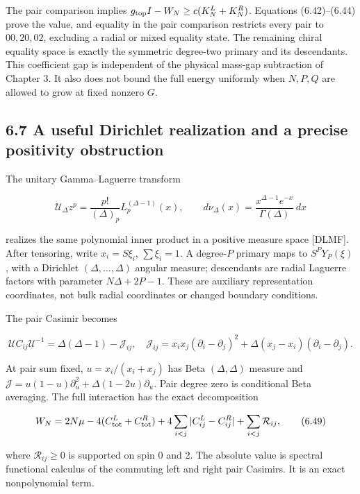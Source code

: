 \documentclass[a4paper,11pt]{article}
\numberwithin{equation}{section}
\begin{document}
The pair comparison implies \(g_{\rm top}I-W_N\ge c(K_N^L+K_N^R)\). Equations (6.42)--(6.44) prove the value, and equality in the pair comparison restricts every pair to \(00,20,02\), excluding a radial or mixed equality state. The remaining chiral equality space is exactly the symmetric degree-two primary and its descendants. This coefficient gap is independent of the physical mass-gap subtraction of Chapter 3. It also does not bound the full energy uniformly when \(N,P,Q\) are allowed to grow at fixed nonzero \(G\).

\hypertarget{a-useful-dirichlet-realization-and-a-precise-positivity-obstruction}{%
\subsection{6.7 A useful Dirichlet realization and a precise positivity obstruction}\label{a-useful-dirichlet-realization-and-a-precise-positivity-obstruction}}

The unitary Gamma--Laguerre transform

\[
\mathcal U_\Delta z^p=\frac{p!}{(\Delta)_p}L_p^{(\Delta-1)}(x),
\qquad d\nu_\Delta(x)=\frac{x^{\Delta-1}e^{-x}}{\Gamma(\Delta)}\,dx
\tag{6.47}
\]

realizes the same polynomial inner product in a positive measure space {[}DLMF{]}. After tensoring, write \(x_i=S\xi_i\), \(\sum\xi_i=1\). A degree-\(P\) primary maps to \(S^PY_P(\xi)\), with a Dirichlet \((\Delta,\ldots,\Delta)\) angular measure; descendants are radial Laguerre factors with parameter \(N\Delta+2P-1\). These are auxiliary representation coordinates, not bulk radial coordinates or changed boundary conditions.

The pair Casimir becomes

\[
\mathcal U C_{ij}\mathcal U^{-1}=\Delta(\Delta-1)-\mathcal J_{ij},
\quad
\mathcal J_{ij}=x_ix_j(\partial_i-\partial_j)^2
+\Delta(x_j-x_i)(\partial_i-\partial_j).
\tag{6.48}
\]

At pair sum fixed, \(u=x_i/(x_i+x_j)\) has Beta \((\Delta,\Delta)\) measure and \(\mathcal J=u(1-u)\partial_u^2+\Delta(1-2u)\partial_u\). Pair degree zero is conditional Beta averaging. The full interaction has the exact decomposition

\[
W_N=2N\mu-4(C_{\rm tot}^L+C_{\rm tot}^R)
+4\sum_{i<j}|C_{ij}^L-C_{ij}^R|+\sum_{i<j}\mathcal R_{ij},
\tag{6.49}
\]

where \(\mathcal R_{ij}\ge0\) is supported on spin 0 and 2. The absolute value is spectral functional calculus of the commuting left and right pair Casimirs. It is an exact nonpolynomial term.
\end{document}
